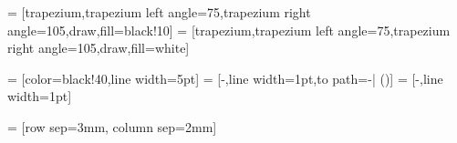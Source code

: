 %

 = [trapezium,trapezium left angle=75,trapezium right angle=105,draw,fill=black!10]
 = [trapezium,trapezium left angle=75,trapezium right angle=105,draw,fill=white]


%

 = [color=black!40,line width=5pt]
 = [-,line width=1pt,to path={-| (\tikztotarget)}]
 = [-,line width=1pt]


 = [row sep=3mm, column sep=2mm]

